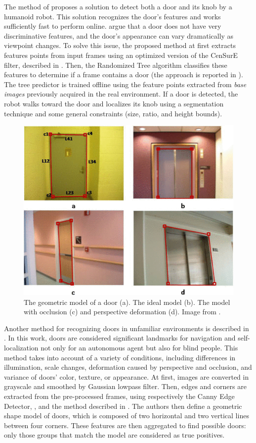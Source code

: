   The method of \cite{humanoid} proposes a solution to detect both a door and its knob by a humanoid robot. This solution recognizes the door's features and works sufficiently fast to perform online. \citeauthor{humanoid} \cite{humanoid} argue that a door does not have very discriminative features, and the door's appearance can vary dramatically as viewpoint changes. To solve this issue, the proposed method at first extracts features points from input frames using an optimized version of the CenSurE filter, described in \cite{censure}. Then, the Randomized Tree algorithm classifies these features to determine if a frame contains a door (the approach is reported in \cite{treefeature}). The tree predictor is trained offline using the feature points extracted from \emph{base images} previously acquired in the real environment. If a door is detected, the robot walks toward the door and localizes its knob using a segmentation technique and some general constraints (size, ratio, and height bounds).
  
\begin{figure}[h!]
	\centering
	\includegraphics[width=0.75\linewidth]{images/corner_door.png}
	\caption{The geometric model of a door (a). The ideal model (b).   The model with occlusion (c) and perspective deformation (d). Image from \cite{cornerdetector}.}
\end{figure}
  
  Another method for recognizing doors in unfamiliar environments is described in \cite{edgeandcornerdoorsdetector}. In this work, doors are considered significant landmarks for navigation and self-localization not only for an autonomous agent but also for blind people. This method takes into account of a variety of conditions, including differences in illumination, scale changes, deformation caused by perspective and occlusion, and variance of doors’ color, texture, or appearance.  
   At first, images are converted in grayscale and smoothed by Gaussian lowpass filter. Then, edges and corners are extracted from the pre-processed frames, using respectively the Canny Edge Detector, \cite{canny}, and the method described in \cite{cornerdetector}. The authors then define a geometric shape model of doors, which is composed of two horizontal and two vertical lines between four corners. These features are then aggregated to find possible doors: only those groups that match the model are considered as true positives.  
   
